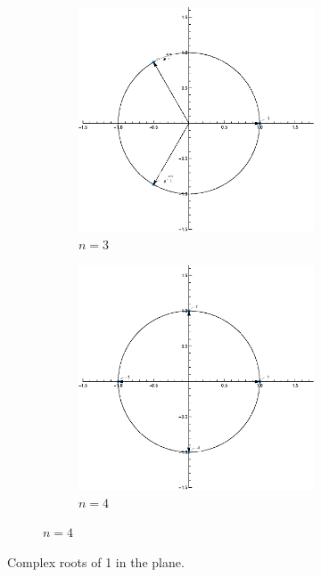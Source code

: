 \documentclass[12pt]{book}
\begin{document}
\begin{figure}[H]
    \centering
    \begin{figure}[H]
        \begin{subfigure}{0.45\textwidth}
            \centering
            \includegraphics[width = \textwidth]{./figs/chapter_1/Complex_roots_1_n3.eps}
            \caption{$n = 3$}
        \end{subfigure}
        \qquad
        \begin{subfigure}{0.45\textwidth}
            \centering
            \includegraphics[width = \textwidth]{./figs/chapter_1/Complex_roots_1_n4.eps}
            \caption{$n = 4$}
        \end{subfigure}
    \end{figure}
    \caption{Complex roots of 1 in the plane.}
\end{figure}
\end{document}
